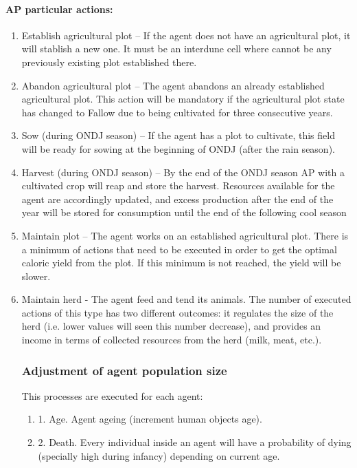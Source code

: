 \begin{enumerate}
\begin{enumerate}
\begin{enumeration}
\begin{enumerate}
\paragraph {AP particular actions:}
\begin{enumerate}
\item Establish agricultural plot – If the agent does not have an agricultural plot, it will
stablish a new one. It must be an interdune cell where cannot be any previously
existing plot established there.
\item Abandon agricultural plot – The agent abandons an already established agricultural
plot. This action will be mandatory if the agricultural plot state has changed to Fallow
due to being cultivated for three consecutive years.
\item Sow (during ONDJ season) – If the agent has a plot to cultivate, this field will be ready
for sowing at the beginning of ONDJ (after the rain season).
\item Harvest (during ONDJ season) – By the end of the ONDJ season AP with a cultivated
crop will reap and store the harvest. Resources available for the agent are accordingly
updated, and excess production after the end of the year will be stored for
consumption until the end of the following cool season
\item Maintain plot – The agent works on an established agricultural plot. There is a
minimum of actions that need to be executed in order to get the optimal caloric yield
from the plot. If this minimum is not reached, the yield will be slower.
\item Maintain herd - The agent feed and tend its animals. The number of executed actions
of this type has two different outcomes: it regulates the size of the herd (i.e. lower
values will seen this number decrease), and provides an income in terms of collected
resources from the herd (milk, meat, etc.).


\subsubsection{Adjustment of agent population size}
This processes are executed for each agent:
\begin{enumerate}
\item 1. Age. Agent ageing (increment human objects age).
\item 2. Death. Every individual inside an agent will have a probability of dying (specially high during
infancy) depending on current age.


\end{enumerate}
\end{enumerate}
\end{enumerate}
\end{enumeration}
\end{enumerate}
\end{enumerate}

